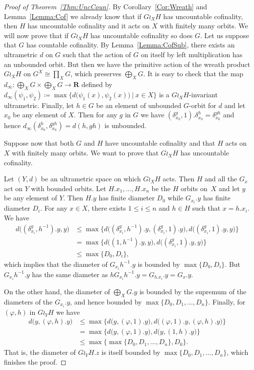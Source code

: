 \documentclass[a4paper]{article}
\theoremstyle{definition}
\newcommand*{\field}[1]{\mathbf{#1}}
\newcommand*{\R}{\field{R}}
\newcommand{\setst}[2]{\{#1\ |\ #2\}}
\begin{document}
\begin{proof}[Proof of Theorem~\ref{Thm:UncCoun}]
By Corollary~\ref{Cor:Wreath} and Lemma~\ref{Lemma:Cof} we already know that if $G \wr_X H$ has uncountable cofinality, then $H$ has uncountable cofinality and it acts on $X$ with finitely many orbits.
We will now prove that if $G \wr_X H$ has uncountable cofinality so does $G$.
Let us suppose that $G$ has countable cofinality. By Lemma~\ref{Lemma:CofSub}, there exists an ultrametric $d$ on $G$ such that the action of $G$ on itself by left multiplication has an unbounded orbit.
But then we have the primitive action of the wreath product $G\wr_XH$ on $G^X\cong\prod_XG$, which preserves $\bigoplus_XG$.
It is easy to check that the map $d_\infty\colon\bigoplus_XG\times\bigoplus_XG\to\R$ defined by $d_\infty(\psi_1,\psi_2)\coloneqq\max\setst{d\bigl(\psi_1(x),\psi_2(x)\bigr)}{x\in X}$ is a $G\wr_XH$-invariant ultrametric.
Finally, let $h\in G$ be an element of unbounded $G$-orbit for $d$ and let $x_0$ be any element of $X$. Then for any $g$ in $G$ we have $(\delta_{x_0}^g,1).\delta_{x_0}^h=\delta_{x_0}^{gh}$ and hence $d_\infty(\delta_{x_0}^h,\delta_{x_0}^{gh})=d(h,gh)$ is unbounded.

Suppose now that both $G$ and $H$ have uncountable cofinality and that $H$ acts on $X$ with finitely many orbits. We want to prove that $G\wr_XH$ has uncountable cofinality.

Let $(Y,d)$ be an ultrametric space on which $G\wr_XH$ acts.
Then $H$ and all the $G_x$ act on $Y$ with bounded orbits.
Let $H.x_1,\dots, H.x_n$ be the $H$ orbits on~$X$ and let $y$ be any element of $Y$.
Then $H.y$ has finite diameter $D_0$ while $G_{x_i}.y$ has finite diameter $D_i$.
For any $x\in X$, there exists $1\leq i\leq n$ and $h\in H$ such that $x=h.x_i$.
We have
\begin{align*}
	d\bigl((\delta_{x_i}^g,h^{-1}).y,y\bigr)&\leq\max\{d\bigl((\delta_{x_i}^g,h^{-1}).y,(\delta_{x_i}^g,1).y\bigr),d\bigl((\delta_{x_i}^g,1).y,y\bigr)\}\\
	&=\max\{d\bigl((1,h^{-1}).y,y\bigr),d\bigl((\delta_{x_i}^g,1).y,y\bigr)\}\\
	&\leq \max\{D_0,D_i\},
\end{align*}
which implies that the diameter of $G_{x_i}h^{-1}.y$ is bounded by $\max\{D_0,D_i\}$.
But $G_{x_i}h^{-1}.y$ has the same diameter as $hG_{x_i}h^{-1}.y=G_{h.x_i}.y=G_x.y$.

On the other hand, the diameter of $\bigoplus_XG.y$ is bounded by the supremum of the diameters of the $G_{x_i}.y$, and hence bounded by $\max\{D_0,D_1,\dots,D_n\}$.
Finally, for $(\varphi,h)$ in $G\wr_YH$ we have
\begin{align*}
	d\bigl(y,(\varphi,h).y\bigr)&\leq\max\{d\bigl(y,(\varphi,1).y\bigr),d\bigl((\varphi,1).y,(\varphi,h).y\bigr)\}\\
	&=\max\{d\bigl(y,(\varphi,1).y\bigr),d\bigl(y,(1,h).y\bigr)\}\\
	&\leq\max\{\max\{D_0,D_1,\dots,D_n\},D_0\}.
\end{align*}
That is, the diameter of $G\wr_YH.z$ is itself bounded by $\max\{D_0,D_1,\dots,D_n\}$, which finishes the proof.
\end{proof}
\end{document}
